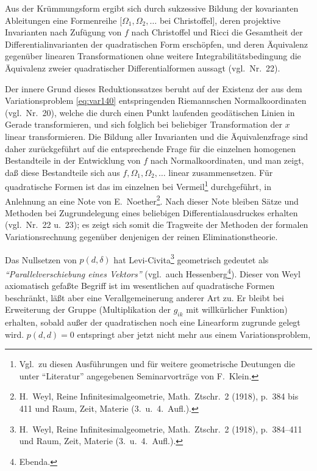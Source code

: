 \documentclass[fontsize=10pt,paper=a5,pagesize,headings=small]{scrbook}
\theoremstyle{plain}
\begin{document}
\newpage
\setcounter{page}{421}

Aus der Krümmungsform ergibt sich durch sukzessive Bildung der kovarianten
Ableitungen eine Formenreihe $[\Omega_1, \Omega_2,\dots$ bei Christoffel$]$,
deren projektive Invarianten nach Zufügung von $f$ nach Christoffel und Ricci
die Gesamtheit der Differentialinvarianten der quadratischen Form erschöpfen,
und deren Äquivalenz gegenüber linearen Transformationen ohne weitere
Integrabilitätsbedingung die Äquivalenz zweier quadratischer Differentialformen
aussagt (vgl.\ Nr.~22).

Der innere Grund dieses Reduktionssatzes beruht auf der Existenz der
aus dem Variationsproblem \eqref{eq:var140} entspringenden Riemannschen
Normalkoordinaten (vgl.\ Nr.~20), welche die durch einen Punkt laufenden
geodätischen Linien in Gerade transformieren, und sich folglich bei beliebiger
Transformation der $x$ linear transformieren. Die Bildung aller Invarianten
und die Äquivalenzfrage sind daher zurückgeführt auf die entsprechende Frage
für die einzelnen homogenen Bestandteile in der Entwicklung von $f$ nach
Normalkoordinaten, und man zeigt, daß diese Bestandteile sich aus $f, \Omega_1,
\Omega_2,\dots$ linear zusammensetzen. Für quadratische Formen ist das im einzelnen
bei Vermeil\footnote{Vgl.\ zu diesen Ausführungen und für weitere geometrische
Deutungen die unter ``Literatur'' angegebenen Seminarvorträge von F.\ Klein.}
durchgeführt, in Anlehnung an eine Note von E.~Noether\footnote{H.~Weyl,
Reine Infinitesimalgeometrie, Math.\ Ztschr.\ 2 (1918), p.~384 bis 411 und
Raum, Zeit, Materie (3.\ u.\ 4.\ Aufl.).}. Nach dieser Note bleiben Sätze und
Methoden bei Zugrundelegung eines beliebigen Differentialausdruckes erhalten
(vgl.\ Nr.~22 u.~23); es zeigt sich somit die Tragweite der Methoden der
formalen Variationsrechnung gegenüber denjenigen der reinen Eliminationstheorie.

Das Nullsetzen von $p(d,\delta)$ hat Levi-Civita\footnote{H.~Weyl, Reine
Infinitesimalgeometrie, Math.\ Ztschr.\ 2 (1918), p.~384--411 und Raum, Zeit,
Materie (3.\ u.\ 4.\ Aufl.).} geometrisch gedeutet als \textit{``Parallelverschiebung
eines Vektors''} (vgl.\ auch Hessenberg\footnote{Ebenda.}). Dieser von Weyl
axiomatisch gefaßte Begriff ist im wesentlichen auf quadratische Formen
beschränkt, läßt aber eine Verallgemeinerung anderer Art zu. Er bleibt bei
Erweiterung der Gruppe (Multiplikation der $g_{ik}$ mit willkürlicher Funktion)
erhalten, sobald außer der quadratischen noch eine Linearform zugrunde gelegt
wird. $p(d,d) = 0$ entspringt aber jetzt nicht mehr aus einem Variationsproblem,
\end{document}
